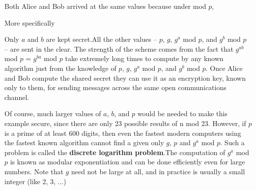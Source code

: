 \documentclass{article}
\begin{document}
Both Alice and Bob arrived at the same values because under mod $p$,
\begin{center}
\end{center}
More specifically
\begin{center}
\end{center}

Only $a$ and $b$ are kept secret.All the other values – $p$, $g$, $g^a$ mod $p$, and $g^b$ mod $p$ – are sent in the clear. The strength of the scheme comes from the fact that $g^{ab}$ mod $p$ = $g^{ba}$ mod $p$ take extremely long times to compute by any known algorithm just from the knowledge of $p$, $g$, $g^{a}$ mod $p$, and $g^b$ mod $p$. Once Alice and Bob compute the shared secret they can use it as an encryption key, known only to them, for sending messages across the same open communications channel.

Of course, much larger values of $a$, $b$, and $p$ would be needed to make this example secure, since there are only 23 possible results of n mod 23. However, if $p$ is a prime of at least 600 digits, then even the fastest modern computers using the fastest known algorithm cannot find a given only $g$, $p$ and $g^a$ mod $p$. Such a problem is called the \textbf{discrete logarithm problem}.The computation of $g^a$ mod $p$ is known as modular exponentiation and can be done efficiently even for large numbers. Note that $g$ need not be large at all, and in practice is usually a small integer (like 2, 3, ...)
\end{document}
